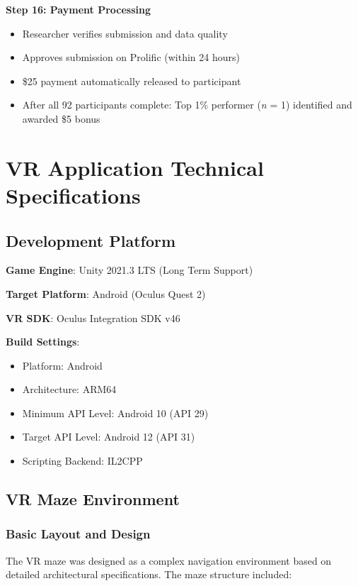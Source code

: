 \documentclass[12pt]{article}
\begin{document}
\textbf{Step 16: Payment Processing}
\begin{itemize}
    \item Researcher verifies submission and data quality
    \item Approves submission on Prolific (within 24 hours)
    \item \$25 payment automatically released to participant
    \item After all 92 participants complete: Top 1\% performer (\textit{n} = 1) identified and awarded \$5 bonus
\end{itemize}

\section{VR Application Technical Specifications}

\subsection{Development Platform}

\textbf{Game Engine}: Unity 2021.3 LTS (Long Term Support)

\textbf{Target Platform}: Android (Oculus Quest 2)

\textbf{VR SDK}: Oculus Integration SDK v46

\textbf{Build Settings}:
\begin{itemize}
    \item Platform: Android
    \item Architecture: ARM64
    \item Minimum API Level: Android 10 (API 29)
    \item Target API Level: Android 12 (API 31)
    \item Scripting Backend: IL2CPP
\end{itemize}

\subsection{VR Maze Environment}

\subsubsection{Basic Layout and Design}

The VR maze was designed as a complex navigation environment based on detailed architectural specifications. The maze structure included:
\end{document}
